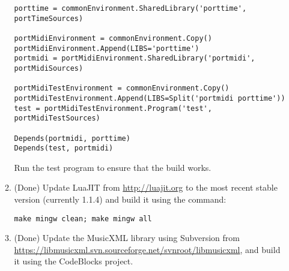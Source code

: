 \documentclass[11pt,letterpaper,onecolumn]{scrartcl}
\begin{document}
\begin{sloppypar}
\begin{enumerate}
\begin{enumerate}
\begin{lstlisting}
porttime = commonEnvironment.SharedLibrary('porttime', portTimeSources)

portMidiEnvironment = commonEnvironment.Copy()
portMidiEnvironment.Append(LIBS='porttime')
portmidi = portMidiEnvironment.SharedLibrary('portmidi', portMidiSources)

portMidiTestEnvironment = commonEnvironment.Copy()
portMidiTestEnvironment.Append(LIBS=Split('portmidi porttime'))
test = portMidiTestEnvironment.Program('test', portMidiTestSources)

Depends(portmidi, porttime)
Depends(test, portmidi)
\end{lstlisting}

			Run the test program to ensure that the build works.
		  
		  \item (Done) Update LuaJIT from \url{http://luajit.org} to the most recent stable version (currently 1.1.4) and build it using the command:
		  
\begin{lstlisting}
make mingw clean; make mingw all
\end{lstlisting}

			\item (Done) Update the MusicXML library using Subversion from \url{https://libmusicxml.svn.sourceforge.net/svnroot/libmusicxml}, and build it using the CodeBlocks project.


\end{enumerate}
\end{enumerate}
\end{sloppypar}
\end{document}
